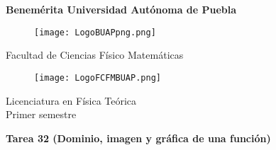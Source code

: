 \documentclass[12pt]{article}
\begin{document}
\begingroup
\begin{titlepage}
	\noindent
	\vspace{1mm}
\end{titlepage}
\endgroup

\pagestyle{empty} 
\setlength{\parindent}{0pt}
\sffamily


\begin{center} 

    \LARGE{\bf{\textsf{Benemérita Universidad Autónoma de Puebla}}} \\[0.5cm]
    
\begin{figure}[htb] \centering

    \texttt{[image: LogoBUAPpng.png]} 

\end{figure}


    \LARGE{Facultad de Ciencias Físico Matemáticas}\\[0.5cm]

\begin{figure}[htb] \centering

    \texttt{[image: LogoFCFMBUAP.png]} 
    
\end{figure} 


    \Large{Licenciatura en Física Teórica}\\[0.5cm]
    \Large{Primer semestre} 

\end{center} \vspace{0.3cm}

\begin{center}

    {\Large{\bfseries{{\textcolor{carrotorange}{Tarea 32 (Dominio, imagen y gráfica de una función)}}}}} \\ 
    
\end{center}
\end{document}
